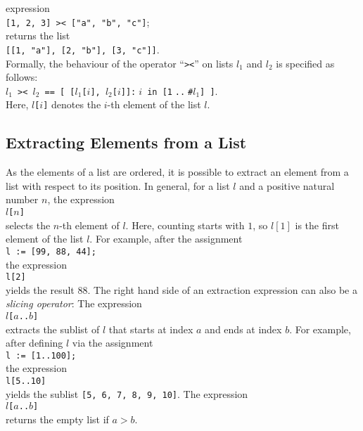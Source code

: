 \begin{enumerate}
      expression      
      \\[0.2cm]
      \hspace*{1.3cm}
      \texttt{[1, 2, 3] >< ["a", "b", "c"]};
      \\[0.2cm]
      returns the list
      \\[0.2cm]
      \hspace*{1.3cm}
      \texttt{[[1, "a"], [2, "b"], [3, "c"]]}.
      \\[0.2cm]
      Formally, the behaviour of the operator ``\texttt{><}'' on lists $l_1$ and $l_2$ is specified as follows:
      \\[0.2cm]
      \hspace*{1.3cm}
      \texttt{$l_1$ >< $l_2$ == [ [$l_1$[$i$], $l_2$[$i$]]:$\;i$ in [1$\;$..$\;$\#$l_1$] ]}.
      \\[0.2cm]
      Here, \texttt{$l$[$i$]} denotes the $i$-th element of the list $l$.
\end{enumerate}

\subsection{Extracting Elements from a List}
As the elements of a list are ordered, it is possible to extract an element from a list with respect
to its position.  In general, for a list $l$ and a positive natural number $n$, the expression
\\[0.2cm]
\hspace*{1.3cm}
\texttt{$l$[$n$]}
\\[0.2cm]
selects the $n$-th element of $l$.  Here, counting starts with $1$, so $l[1]$ is the first element
of the list $l$.  For example, after the assignment
\\[0.2cm]
\hspace*{1.3cm}
\texttt{l := [99, 88, 44];}
\\[0.2cm]
the expression 
\\[0.2cm]
\hspace*{1.3cm}
\texttt{l[2]}
\\[0.2cm]
yields the result $88$.  The right hand side of an extraction expression can also be a \emph{slicing operator}:
The expression
\\[0.2cm]
\hspace*{1.3cm}
\texttt{$l$[$a$..$b$]}
\\[0.2cm]
extracts the sublist of $l$ that starts at index $a$ and ends at index $b$.  For example,
after defining $l$ via the assignment
\\[0.2cm]
\hspace*{1.3cm}
\texttt{l := [1..100];}
\\[0.2cm]
the expression
\\[0.2cm]
\hspace*{1.3cm}
\texttt{l[5..10]}
\\[0.2cm]
yields the sublist \texttt{[5, 6, 7, 8, 9, 10]}.  The  expression 
\\[0.2cm]
\hspace*{1.3cm}
\texttt{$l$[$a$..$b$]}
\\[0.2cm]
returns the empty list if $a > b$.  

